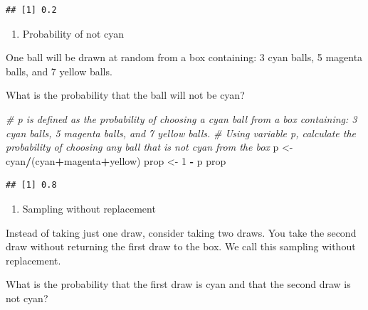 \documentclass[
]{article}
\newenvironment{Shaded}{\begin{snugshade}}{\end{snugshade}}
\newcommand{\CommentTok}[1]{\textcolor[rgb]{0.56,0.35,0.01}{\textit{#1}}}
\newcommand{\DecValTok}[1]{\textcolor[rgb]{0.00,0.00,0.81}{#1}}
\newcommand{\NormalTok}[1]{#1}
\newcommand{\OperatorTok}[1]{\textcolor[rgb]{0.81,0.36,0.00}{\textbf{#1}}}
\newcommand{\StringTok}[1]{\textcolor[rgb]{0.31,0.60,0.02}{#1}}
\providecommand{\tightlist}{%
  \setlength{\itemsep}{0pt}\setlength{\parskip}{0pt}}
\begin{document}
\begin{verbatim}
## [1] 0.2
\end{verbatim}

\begin{enumerate}
\def\labelenumi{\arabic{enumi}.}
\setcounter{enumi}{1}
\tightlist
\item
  Probability of not cyan
\end{enumerate}

One ball will be drawn at random from a box containing: 3 cyan balls, 5
magenta balls, and 7 yellow balls.

What is the probability that the ball will not be cyan?

\begin{Shaded}
\begin{Highlighting}[]
\CommentTok{\# \textasciigrave{}p\textasciigrave{} is defined as the probability of choosing a cyan ball from a box containing: 3 cyan balls, 5 magenta balls, and 7 yellow balls.}
\CommentTok{\# Using variable \textasciigrave{}p\textasciigrave{}, calculate the probability of choosing any ball that is not cyan from the box}
\NormalTok{p \textless{}{-}}\StringTok{ }\NormalTok{cyan}\OperatorTok{/}\NormalTok{(cyan}\OperatorTok{+}\NormalTok{magenta}\OperatorTok{+}\NormalTok{yellow)}
\NormalTok{prop \textless{}{-}}\StringTok{ }\DecValTok{1} \OperatorTok{{-}}\StringTok{ }\NormalTok{p}
\NormalTok{prop}
\end{Highlighting}
\end{Shaded}

\begin{verbatim}
## [1] 0.8
\end{verbatim}

\begin{enumerate}
\def\labelenumi{\arabic{enumi}.}
\setcounter{enumi}{2}
\tightlist
\item
  Sampling without replacement
\end{enumerate}

Instead of taking just one draw, consider taking two draws. You take the
second draw without returning the first draw to the box. We call this
sampling without replacement.

What is the probability that the first draw is cyan and that the second
draw is not cyan?
\end{document}
